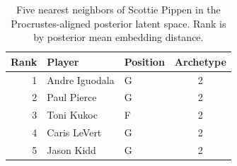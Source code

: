 \begin{table}[htbp]
  \centering\small
  \begin{tabular}{rllc}
    \toprule
    Rank & Player & Position & Archetype \\
    \midrule
    1 & Andre Iguodala & G & 2 \\
    2 & Paul Pierce & G & 2 \\
    3 & Toni Kukoc & F & 2 \\
    4 & Caris LeVert & G & 2 \\
    5 & Jason Kidd & G & 2 \\
    \bottomrule
  \end{tabular}
  \caption{Five nearest neighbors of Scottie Pippen in the Procrustes-aligned posterior latent space. Rank is by posterior mean embedding distance.}
  \label{tab:Scottie_Pippen_neighbors}
\end{table}

